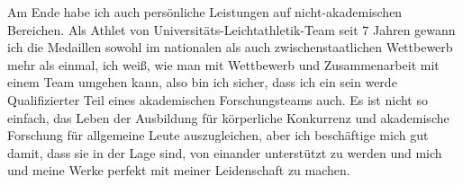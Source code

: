 \documentclass[11pt, a4paper]{awesome-cv} %
\begin{document}
Am Ende habe ich auch persönliche Leistungen auf nicht-akademischen Bereichen. Als Athlet von Universitäts-Leichtathletik-Team seit 7 Jahren gewann ich die Medaillen sowohl im nationalen als auch zwischenstaatlichen Wettbewerb mehr als einmal, ich weiß, wie man mit Wettbewerb und Zusammenarbeit mit einem Team umgehen kann, also bin ich sicher, dass ich ein sein werde Qualifizierter Teil eines akademischen Forschungsteams auch. Es ist nicht so einfach, das Leben der Ausbildung für körperliche Konkurrenz und akademische Forschung für allgemeine Leute auszugleichen, aber ich beschäftige mich gut damit, dass sie in der Lage sind, von einander unterstützt zu werden und mich und meine Werke perfekt mit meiner Leidenschaft zu machen.

\end{document}
